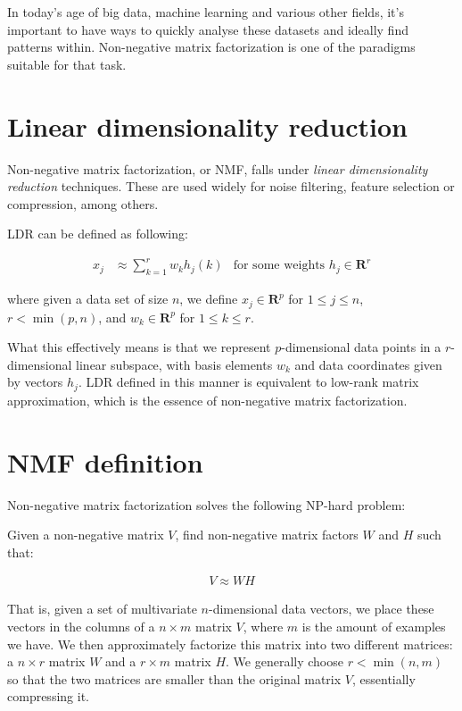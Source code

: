 In today's age of big data, machine learning and various other fields, it's important to have ways to quickly analyse these datasets and ideally find patterns within. Non-negative matrix factorization is one of the paradigms suitable for that task.

\section{Linear dimensionality reduction}
Non-negative matrix factorization, or NMF, falls under \emph{linear dimensionality reduction} techniques. These are used widely for noise filtering, feature selection or compression, among others.

LDR can be defined as following: \cite{nmf_why_how}

\begin{align}
x_j &\approx \sum_{k=1}^{r}w_kh_j(k) &\text{for some weights $h_j \in \mathbf{R}^r$}
\end{align}

where given a data set of size $n$, we define $x_j \in \mathbf{R}^p$ for $1 \leq j \leq n$, $r < \min(p,n)$, and $w_k \in \mathbf{R}^p$ for $1 \leq k \leq r$.

What this effectively means is that we represent $p$-dimensional data points in a $r$-dimensional linear subspace, with basis elements $w_k$ and data coordinates given by vectors $h_j$. LDR defined in this manner is equivalent to low-rank matrix approximation, which is the essence of non-negative matrix factorization.

\section{NMF definition}
Non-negative matrix factorization solves the following NP-hard problem:

Given a non-negative matrix $V$, find non-negative matrix factors $W$ and $H$ such that:

\begin{align}
V \approx WH
\end{align}

That is, given a set of multivariate $n$-dimensional data vectors, we place these vectors in the columns of a $n \times m$ matrix $V$, where $m$ is the amount of examples we have. We then approximately factorize this matrix into two different matrices: a $n \times r$ matrix $W$ and a $r \times m$ matrix $H$. We generally choose $r < \min(n,m)$ so that the two matrices are smaller than the original matrix $V$, essentially compressing it. \cite{nmf_algorithms}

